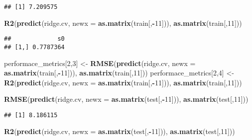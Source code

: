 \documentclass[
]{article}
\newenvironment{Shaded}{\begin{snugshade}}{\end{snugshade}}
\newcommand{\DataTypeTok}[1]{\textcolor[rgb]{0.13,0.29,0.53}{#1}}
\newcommand{\DecValTok}[1]{\textcolor[rgb]{0.00,0.00,0.81}{#1}}
\newcommand{\KeywordTok}[1]{\textcolor[rgb]{0.13,0.29,0.53}{\textbf{#1}}}
\newcommand{\NormalTok}[1]{#1}
\newcommand{\OperatorTok}[1]{\textcolor[rgb]{0.81,0.36,0.00}{\textbf{#1}}}
\newcommand{\StringTok}[1]{\textcolor[rgb]{0.31,0.60,0.02}{#1}}
\begin{document}
\begin{verbatim}
## [1] 7.209575
\end{verbatim}

\begin{Shaded}
\begin{Highlighting}[]
\KeywordTok{R2}\NormalTok{(}\KeywordTok{predict}\NormalTok{(ridge.cv, }\DataTypeTok{newx =} \KeywordTok{as.matrix}\NormalTok{(train[,}\OperatorTok{-}\DecValTok{11}\NormalTok{])), }\KeywordTok{as.matrix}\NormalTok{(train[,}\DecValTok{11}\NormalTok{]))}
\end{Highlighting}
\end{Shaded}

\begin{verbatim}
##             s0
## [1,] 0.7787364
\end{verbatim}

\begin{Shaded}
\begin{Highlighting}[]
\NormalTok{performace_metrics[}\DecValTok{2}\NormalTok{,}\DecValTok{3}\NormalTok{] <-}\StringTok{ }\KeywordTok{RMSE}\NormalTok{(}\KeywordTok{predict}\NormalTok{(ridge.cv, }\DataTypeTok{newx =} \KeywordTok{as.matrix}\NormalTok{(train[,}\OperatorTok{-}\DecValTok{11}\NormalTok{])), }\KeywordTok{as.matrix}\NormalTok{(train[,}\DecValTok{11}\NormalTok{]))}
\NormalTok{performace_metrics[}\DecValTok{2}\NormalTok{,}\DecValTok{4}\NormalTok{] <-}\StringTok{ }\KeywordTok{R2}\NormalTok{(}\KeywordTok{predict}\NormalTok{(ridge.cv, }\DataTypeTok{newx =} \KeywordTok{as.matrix}\NormalTok{(train[,}\OperatorTok{-}\DecValTok{11}\NormalTok{])), }\KeywordTok{as.matrix}\NormalTok{(train[,}\DecValTok{11}\NormalTok{]))}

\KeywordTok{RMSE}\NormalTok{(}\KeywordTok{predict}\NormalTok{(ridge.cv, }\DataTypeTok{newx =} \KeywordTok{as.matrix}\NormalTok{(test[,}\OperatorTok{-}\DecValTok{11}\NormalTok{])), }\KeywordTok{as.matrix}\NormalTok{(test[,}\DecValTok{11}\NormalTok{]))}
\end{Highlighting}
\end{Shaded}

\begin{verbatim}
## [1] 8.186115
\end{verbatim}

\begin{Shaded}
\begin{Highlighting}[]
\KeywordTok{R2}\NormalTok{(}\KeywordTok{predict}\NormalTok{(ridge.cv, }\DataTypeTok{newx =} \KeywordTok{as.matrix}\NormalTok{(test[,}\OperatorTok{-}\DecValTok{11}\NormalTok{])), }\KeywordTok{as.matrix}\NormalTok{(test[,}\DecValTok{11}\NormalTok{]))}
\end{Highlighting}
\end{Shaded}
\end{document}
